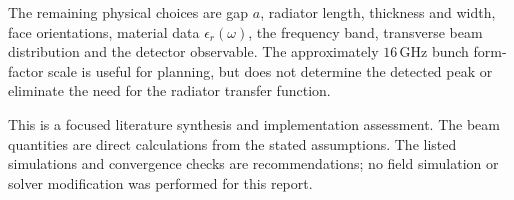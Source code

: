 \documentclass[11pt,a4paper]{article}
\newcommand{\unit}[1]{\,\mathrm{#1}}
\numberwithin{equation}{section}
\begin{document}
The remaining physical choices are gap \(a\), radiator length, thickness
and width, face orientations, material data \(\epsilon_r(\omega)\), the
frequency band, transverse beam distribution and the detector observable.
The approximately \(16\unit{GHz}\) bunch form-factor scale is useful for
planning, but does not determine the detected peak or eliminate the
need for the radiator transfer function.

This is a focused literature synthesis and implementation assessment.
The beam quantities are direct calculations from the stated assumptions.
The listed simulations and convergence checks are recommendations;
no field simulation or solver modification was performed for this report.

\clearpage
\renewcommand{\bibsection}{\section{Literature and software references}}

\end{document}
